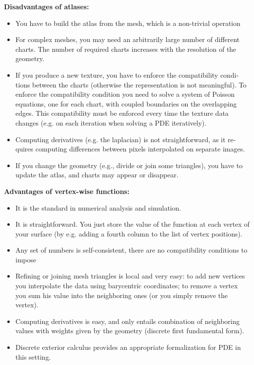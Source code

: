 \documentclass{article}
\begin{document}
\begin{otherlanguage}{british}
{\bf Disadvantages of atlases:}

\begin{itemize}
	\item You have to build the atlas from the mesh, which is a non-trivial
		operation
	\item For complex meshes, you may need an arbitrarily large number
		of different charts.  The number of required charts increases
		with the resolution of the geometry.
	\item If you produce a new texture, you have to enforce the
		compatibility conditions between the charts (otherwise the
		representation is not meaningful).  To enforce the
		compatibility condition you need to solve
		a system of Poisson equations, one for each chart, with
		coupled boundaries on the overlapping edges.  This
		compatibility must be enforced every time the texture data
		changes (e.g. on each iteration when solving a PDE
		iteratively).
	\item Computing derivatives (e.g. the laplacian) is not
		straightforward, as it requires computing differences
		between pixels interpolated on separate images.
	\item If you change the geometry (e.g., divide or join some
		triangles), you have to update the atlas, and charts may
		appear or disappear.
\end{itemize}

{\bf Advantages of vertex-wise functions:}

\begin{itemize}
	\item It is the standard in numerical analysis and simulation.
	\item It is straightforward. You just store the value of the function
		at each vertex of your surface (by e.g. adding a fourth
		column to the list of vertex positions).
	\item Any set of numbers is self-consistent, there are no
		compatibility conditions to impose
	\item Refining or joining mesh triangles is local and very easy: to add
		new vertices you interpolate the data using barycentric
		coordinates; to remove a vertex you sum his value into the
		neighboring ones (or you simply remove the vertex).
	\item Computing derivatives is easy, and only entails combination of
		neighboring values with weights given by the geometry
		(discrete first fundamental form).
	\item Discrete exterior calculus provides an appropriate
		formalization for PDE in this setting.
\end{itemize}


\end{otherlanguage}
\end{document}
